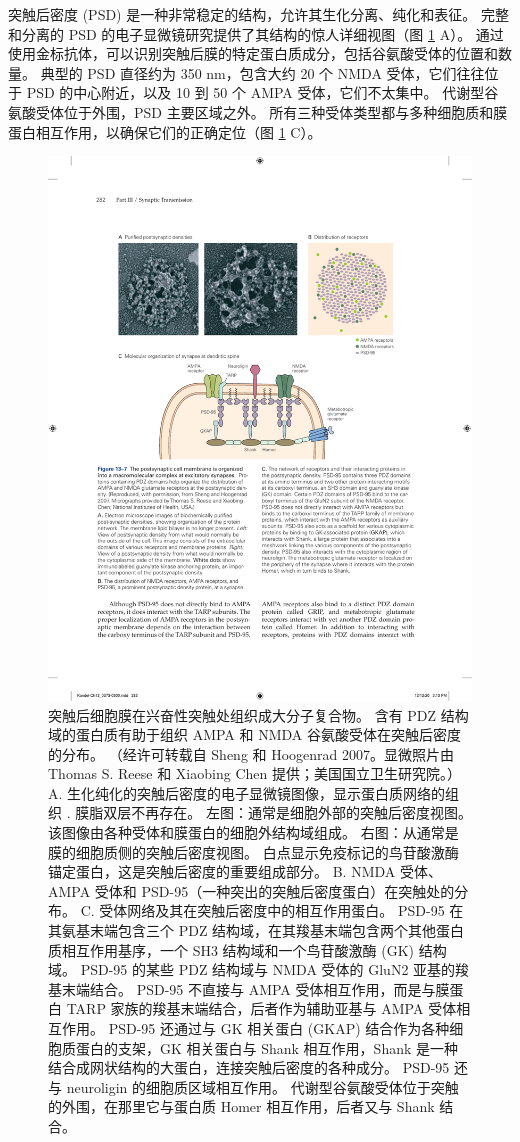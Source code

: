 突触后密度 (PSD) 是一种非常稳定的结构，允许其生化分离、纯化和表征。 
完整和分离的 PSD 的电子显微镜研究提供了其结构的惊人详细视图（图 \ref{fig:13_7} A）。 
通过使用金标抗体，可以识别突触后膜的特定蛋白质成分，包括谷氨酸受体的位置和数量。 
典型的 PSD 直径约为 350 nm，包含大约 20 个 NMDA 受体，它们往往位于 PSD 的中心附近，以及 10 到 50 个 AMPA 受体，它们不太集中。 
代谢型谷氨酸受体位于外围，PSD 主要区域之外。
所有三种受体类型都与多种细胞质和膜蛋白相互作用，以确保它们的正确定位（图 \ref{fig:13_7} C）。

\begin{figure}[htbp]
	\centering
	\includegraphics[width=0.7\linewidth]{chap13/fig_13_7}
	\caption{突触后细胞膜在兴奋性突触处组织成大分子复合物。 含有 PDZ 结构域的蛋白质有助于组织 AMPA 和 NMDA 谷氨酸受体在突触后密度的分布。 （经许可转载自 Sheng 和 Hoogenrad 2007。显微照片由 Thomas S. Reese 和 Xiaobing Chen 提供；美国国立卫生研究院。）A. 生化纯化的突触后密度的电子显微镜图像，显示蛋白质网络的组织 . 膜脂双层不再存在。 左图：通常是细胞外部的突触后密度视图。 该图像由各种受体和膜蛋白的细胞外结构域组成。 右图：从通常是膜的细胞质侧的突触后密度视图。 白点显示免疫标记的鸟苷酸激酶锚定蛋白，这是突触后密度的重要组成部分。 B. NMDA 受体、AMPA 受体和 PSD-95（一种突出的突触后密度蛋白）在突触处的分布。 C. 受体网络及其在突触后密度中的相互作用蛋白。 PSD-95 在其氨基末端包含三个 PDZ 结构域，在其羧基末端包含两个其他蛋白质相互作用基序，一个 SH3 结构域和一个鸟苷酸激酶 (GK) 结构域。 PSD-95 的某些 PDZ 结构域与 NMDA 受体的 GluN2 亚基的羧基末端结合。 PSD-95 不直接与 AMPA 受体相互作用，而是与膜蛋白 TARP 家族的羧基末端结合，后者作为辅助亚基与 AMPA 受体相互作用。 PSD-95 还通过与 GK 相关蛋白 (GKAP) 结合作为各种细胞质蛋白的支架，GK 相关蛋白与 Shank 相互作用，Shank 是一种结合成网状结构的大蛋白，连接突触后密度的各种成分。 PSD-95 还与 neuroligin 的细胞质区域相互作用。 代谢型谷氨酸受体位于突触的外围，在那里它与蛋白质 Homer 相互作用，后者又与 Shank 结合。}
	\label{fig:13_7}
\end{figure}


